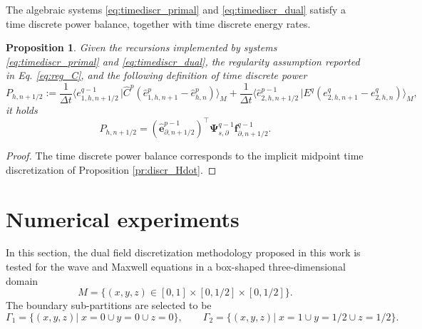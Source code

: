 \documentclass{elsarticle}
\newtheorem{proposition}{Proposition}
\newcommand*{\dual}[1]{\ensuremath{\widehat{#1}}}
\newcommand{\dualpr}[3][]{\ensuremath{\langle #2 \, \vert #3 \rangle_{#1}}}
\begin{document}
The algebraic systems \eqref{eq:timediscr_primal} and \eqref{eq:timediscr_dual} satisfy a time discrete power balance, together with time discrete energy rates.
\begin{proposition}\label{pr:discrtime_Hdot}
Given the recursions implemented by systems \eqref{eq:timediscr_primal} and \eqref{eq:timediscr_dual}, the regularity assumption reported in Eq. \eqref{eq:reg_C}, and the following definition of time discrete power
\begin{equation*}
    P_{h, n+1/2} := \frac{1}{\Delta t}\dualpr[M]{e^{q-1}_{1, h, n+1/2}}{\dual{C}^p (\dual{e}^p_{1, h, n+1}- \dual{e}^p_{h, n})} + \frac{1}{\Delta t}\dualpr[M]{\dual{e}^{p-1}_{2, h, n+1/2}}{E^q ({e}^q_{2, h, n+1}-{e}^q_{2, h, n})},
\end{equation*}
it holds
\begin{equation}
    P_{h, n+1/2} = (\dual{\mathbf{e}}_{\partial, n+1/2}^{p-1})^\top \mathbf{\Psi}^{q-1}_{s, \partial}\mathbf{f}_{\partial, n+1/2}^{q-1}.
\end{equation}
\end{proposition}
\begin{proof}
The time discrete power balance corresponds to the implicit midpoint time discretization of Proposition \ref{pr:discr_Hdot}.
\end{proof}


\section{Numerical experiments}\label{sec:num_exp}

In this section, the dual field discretization methodology proposed in this work is tested for the wave and Maxwell equations in a box-shaped three-dimensional domain
$$M = \{ (x,y,z) \in [0, 1]\times[0, 1/2]\times[0, 1/2] \}.$$ 
The boundary sub-partitions are selected to be
\begin{equation*}
    \Gamma_1 = \{(x,y,z) \vert \; x=0 \cup y=0 \cup z=0\}, \qquad \Gamma_2 = \{(x, y, z) \vert \; x=1 \cup y=1/2 \cup z=1/2 \}.
\end{equation*}
\end{document}
